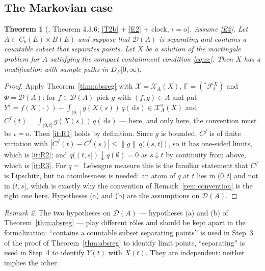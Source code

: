\documentclass[11pt,a4paper]{article}
\theoremstyle{plain}
\newtheorem{theorem}{Theorem}[section]
\theoremstyle{definition}
\theoremstyle{remark}
\newtheorem{remark}[theorem]{Remark}
\newcommand{\Bdd}{B}                           %
\newcommand{\Cb}{C_b}                          %
\newcommand{\DE}{D_E[0,\infty)}
\newcommand{\dom}{\mathcal{D}}                 %
\newcommand{\Filt}{\mathcal{F}}
\newcommand{\XX}{\mathcal{X}}                  %
\newcommand{\dif}{\,\mathrm{d}}
\newcommand{\EK}{\cite{EK86}}
\begin{document}
\subsection{The Markovian case}
\label{ssec:cadlagmarkov}

\begin{theorem}[\EK, Theorem 4.3.6; \eqref{T2b} + \eqref{E2} + clock, $\iota = \mathrm{o}$]
  \label{thm:cadlag}
  Assume \eqref{E2}.  Let $A \subset \Cb(E) \times \Bdd(E)$ and suppose that
  $\dom(A)$ is separating and contains a countable subset that separates points.
  Let $X$ be a solution of the martingale problem for $A$ satisfying the compact
  containment condition \eqref{eq:cc}.  Then $X$ has a modification with sample
  paths in $\DE$.
\end{theorem}

\begin{proof}
  Apply Theorem~\ref{thm:absreg} with $\XX = \XX_A(X)$,
  $\mathbb{F} = ({}^{*}\Filt^X_t)$ and $\Phi = \dom(A)$: for $f \in \dom(A)$ pick
  $g$ with $(f,g) \in A$ and put
  $Y^f = f(X(\cdot)) - \int_{(0,\cdot]} g(X(s))\,q(\dif s) \in \XX^{\mathrm{o}}_A(X)$
  and $C^f(t) = \int_{(0,t]} g(X(s))\,q(\dif s)$ --- here, and only here, the
  convention must be $\iota = \mathrm{o}$.  Then \ref{it:R1} holds by
  definition.  Since $g$ is bounded, $C^f$ is of finite variation with
  $|C^f(t) - C^f(s)| \leq \lVert g \rVert \, q((s,t])$, so it has one-sided
  limits, which is \ref{it:R2}; and $q((t,s]) \downarrow q(\emptyset) = 0$ as
  $s \downarrow t$ by continuity from above, which is \ref{it:R3}.  For
  $q = $ Lebesgue measure this is the familiar statement that $C^f$ is Lipschitz,
  but no atomlessness is needed: an atom of $q$ at $t$ lies in $(0,t]$ and not in
  $(t,s]$, which is exactly why the convention of Remark~\ref{rem:convention} is
  the right one here.  Hypotheses (a) and (b) are the assumptions on $\dom(A)$.
\end{proof}

\begin{remark}
  \label{rem:cadlagseparating}
  The two hypotheses on $\dom(A)$ --- hypotheses (a) and (b) of
  Theorem~\ref{thm:absreg} --- play different r\^oles and should be kept apart in
  the formalization: ``contains a countable subset separating points'' is used in
  Step~3 of the proof of Theorem~\ref{thm:absreg} to identify limit points,
  ``separating'' is used in Step~4 to identify $Y(t)$ with $X(t)$.  They are
  independent: neither implies the other.
\end{remark}
\end{document}
